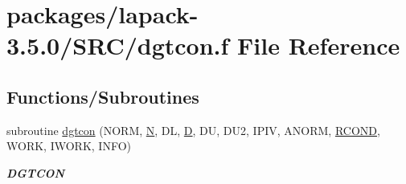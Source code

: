 \hypertarget{dgtcon_8f}{}\section{packages/lapack-\/3.5.0/\+S\+R\+C/dgtcon.f File Reference}
\label{dgtcon_8f}
\subsection*{Functions/\+Subroutines}
\begin{DoxyCompactItemize}
\item 
subroutine \hyperlink{group__doubleGTcomputational_ga55242c56fbb3243e6c9b897880182a4b}{dgtcon} (N\+O\+R\+M, \hyperlink{polmisc_8c_a0240ac851181b84ac374872dc5434ee4}{N}, D\+L, \hyperlink{odrpack_8h_a7dae6ea403d00f3687f24a874e67d139}{D}, D\+U, D\+U2, I\+P\+I\+V, A\+N\+O\+R\+M, \hyperlink{superlu__enum__consts_8h_af00a42ecad444bbda75cde1b64bd7e72a9b5c151728d8512307565994c89919d5}{R\+C\+O\+N\+D}, W\+O\+R\+K, I\+W\+O\+R\+K, I\+N\+F\+O)
\begin{DoxyCompactList}\small\item\em {\bfseries D\+G\+T\+C\+O\+N} \end{DoxyCompactList}\end{DoxyCompactItemize}
